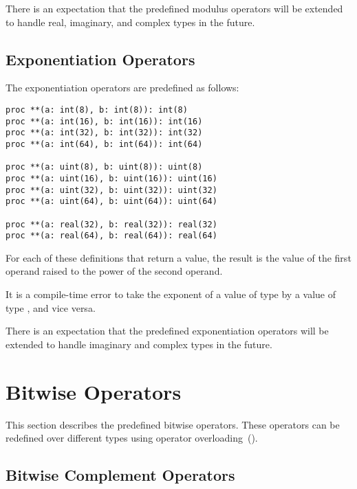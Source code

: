 There is an expectation that the predefined modulus operators will be
extended to handle real, imaginary, and complex types in the future.

\subsection{Exponentiation Operators}
\label{Exponentiation_Operators}

The exponentiation operators are predefined as follows:
\begin{chapel}
\begin{verbatim}
proc **(a: int(8), b: int(8)): int(8)
proc **(a: int(16), b: int(16)): int(16)
proc **(a: int(32), b: int(32)): int(32)
proc **(a: int(64), b: int(64)): int(64)

proc **(a: uint(8), b: uint(8)): uint(8)
proc **(a: uint(16), b: uint(16)): uint(16)
proc **(a: uint(32), b: uint(32)): uint(32)
proc **(a: uint(64), b: uint(64)): uint(64)

proc **(a: real(32), b: real(32)): real(32)
proc **(a: real(64), b: real(64)): real(64)
\end{verbatim}
\end{chapel}
For each of these definitions that return a value, the result is the
value of the first operand raised to the power of the second operand.

It is a compile-time error to take the exponent of a value of
type  by a value of type , and vice
versa.

There is an expectation that the predefined exponentiation operators
will be extended to handle imaginary and complex types in the future.

\section{Bitwise Operators}
\label{Bitwise_Operators}

This section describes the predefined bitwise operators.  These
operators can be redefined over different types using operator
overloading~().

\subsection{Bitwise Complement Operators}
\label{Bitwise_Complement_Operators}

